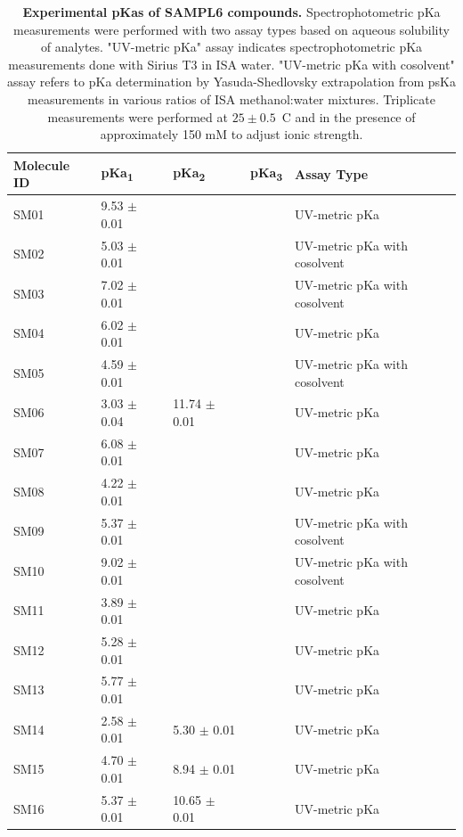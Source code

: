 \documentclass[9pt,lineno]{elife}
\begin{document}
\begin{table}[tb!]
\begin{center}
\begin{threeparttable}
\centering
\caption{{\bf Experimental pKas of SAMPL6 compounds.} 
Spectrophotometric pKa measurements were performed with two assay types based on aqueous solubility of analytes. "UV-metric pKa" assay indicates spectrophotometric pKa measurements done with Sirius T3 in ISA water. "UV-metric pKa with cosolvent" assay refers to pKa determination by Yasuda-Shedlovsky extrapolation from psKa measurements in various ratios of ISA methanol:water mixtures. Triplicate measurements were performed at $25 \pm 0.5$~\textdegree C and in the presence of approximately 150 mM  to adjust ionic strength.} 
\label{UV-metric_pKa_table}
\begin{tabular}{@{}lllll@{}}
\toprule
{\bf Molecule ID} & {\bf pKa\textsubscript{1}} & {\bf pKa\textsubscript{2}} & {\bf pKa\textsubscript{3}} & {\bf Assay Type} \\ \midrule
SM01 & 9.53 $\pm$ 0.01 &  &  & UV-metric pKa \\
SM02 & 5.03 $\pm$ 0.01 &  &  & UV-metric pKa with cosolvent \\
SM03 & 7.02 $\pm$ 0.01 &  &  & UV-metric pKa with cosolvent \\
SM04 & 6.02 $\pm$ 0.01 &  &  & UV-metric pKa \\
SM05 & 4.59 $\pm$ 0.01 &  &  & UV-metric pKa with cosolvent \\
SM06 & 3.03 $\pm$ 0.04 & 11.74 $\pm$ 0.01 &  & UV-metric pKa \\
SM07 & 6.08 $\pm$ 0.01 &  &  & UV-metric pKa \\
SM08 & 4.22 $\pm$ 0.01 &  &  & UV-metric pKa \\
SM09 & 5.37 $\pm$ 0.01 &  &  & UV-metric pKa with cosolvent \\
SM10 & 9.02 $\pm$ 0.01 &  &  & UV-metric pKa with cosolvent \\
SM11 & 3.89 $\pm$ 0.01 &  &  & UV-metric pKa \\
SM12 & 5.28 $\pm$ 0.01 &  &  & UV-metric pKa \\
SM13 & 5.77 $\pm$ 0.01 &  &  & UV-metric pKa \\
SM14 & 2.58 $\pm$ 0.01 & 5.30 $\pm$ 0.01 &  & UV-metric pKa \\
SM15 & 4.70 $\pm$ 0.01 & 8.94 $\pm$ 0.01 &  & UV-metric pKa \\
SM16 & 5.37 $\pm$ 0.01 & 10.65 $\pm$ 0.01 &  & UV-metric pKa \\

\end{tabular}
\end{threeparttable}
\end{center}
\end{table}
\end{document}
